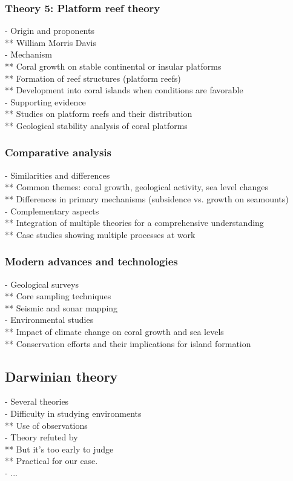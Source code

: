 \subsubsection{Theory 5: Platform reef theory}
- Origin and proponents \\
** William Morris Davis \\
- Mechanism \\
** Coral growth on stable continental or insular platforms \\
** Formation of reef structures (platform reefs) \\
** Development into coral islands when conditions are favorable \\
- Supporting evidence \\
** Studies on platform reefs and their distribution \\
** Geological stability analysis of coral platforms

\subsubsection{Comparative analysis}
- Similarities and differences \\
** Common themes: coral growth, geological activity, sea level changes \\
** Differences in primary mechanisms (subsidence vs. growth on seamounts) \\
- Complementary aspects \\
** Integration of multiple theories for a comprehensive understanding \\
** Case studies showing multiple processes at work 

\subsubsection{Modern advances and technologies}
- Geological surveys \\
** Core sampling techniques \\
** Seismic and sonar mapping \\
- Environmental studies \\
** Impact of climate change on coral growth and sea levels \\
** Conservation efforts and their implications for island formation

\subsection{Darwinian theory}
- Several theories \\
- Difficulty in studying environments \\
** Use of observations \\
- Theory refuted by \cite{Droxler2021} \\
** But it's too early to judge \\
** Practical for our case. \\
- ...


